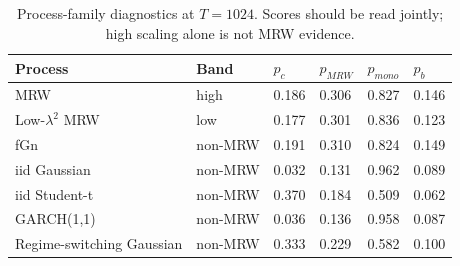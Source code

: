 \begin{table}[t]
\centering
\small
\caption{Process-family diagnostics at \(T=1024\). Scores should be read jointly; high scaling alone is not MRW evidence.}
\label{tab:table1_process_family_diagnostics}
\begin{tabular}{llllll}
\toprule
Process & Band & \(p_c\) & \(p_{MRW}\) & \(p_{mono}\) & \(p_b\) \\
\midrule
MRW & high & 0.186 & 0.306 & 0.827 & 0.146 \\
Low-\(\lambda^2\) MRW & low & 0.177 & 0.301 & 0.836 & 0.123 \\
fGn & non-MRW & 0.191 & 0.310 & 0.824 & 0.149 \\
iid Gaussian & non-MRW & 0.032 & 0.131 & 0.962 & 0.089 \\
iid Student-t & non-MRW & 0.370 & 0.184 & 0.509 & 0.062 \\
GARCH(1,1) & non-MRW & 0.036 & 0.136 & 0.958 & 0.087 \\
Regime-switching Gaussian & non-MRW & 0.333 & 0.229 & 0.582 & 0.100 \\
\bottomrule
\end{tabular}
\end{table}
